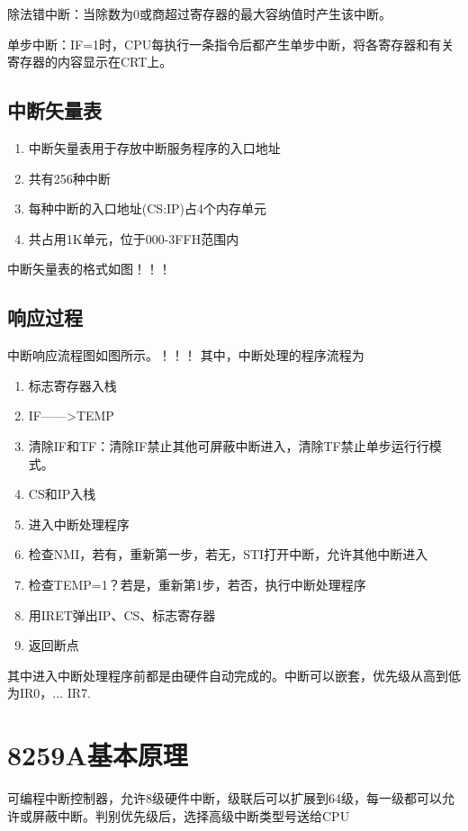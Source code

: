 除法错中断：当除数为0或商超过寄存器的最大容纳值时产生该中断。

单步中断：IF=1时，CPU每执行一条指令后都产生单步中断，将各寄存器和有关寄存器的内容显示在CRT上。
\subsection{中断矢量表}
\begin{enumerate}
    \item 中断矢量表用于存放中断服务程序的入口地址
    \item 共有256种中断
    \item 每种中断的入口地址(CS:IP)占4个内存单元
    \item 共占用1K单元，位于000-3FFH范围内
\end{enumerate}
中断矢量表的格式如图！！！
\subsection{响应过程}
中断响应流程图如图所示。！！！
其中，中断处理的程序流程为
\begin{enumerate}
    \item 标志寄存器入栈
    \item IF——>TEMP
    \item 清除IF和TF：清除IF禁止其他可屏蔽中断进入，清除TF禁止单步运行行模式。
    \item CS和IP入栈
    \item 进入中断处理程序
    \item 检查NMI，若有，重新第一步，若无，STI打开中断，允许其他中断进入
    \item 检查TEMP=1？若是，重新第1步，若否，执行中断处理程序
    \item 用IRET弹出IP、CS、标志寄存器
    \item 返回断点
\end{enumerate}
其中进入中断处理程序前都是由硬件自动完成的。中断可以嵌套，优先级从高到低为IR0，... IR7.
\section{8259A基本原理}
可编程中断控制器，允许8级硬件中断，级联后可以扩展到64级，每一级都可以允许或屏蔽中断。判别优先级后，选择高级中断类型号送给CPU
